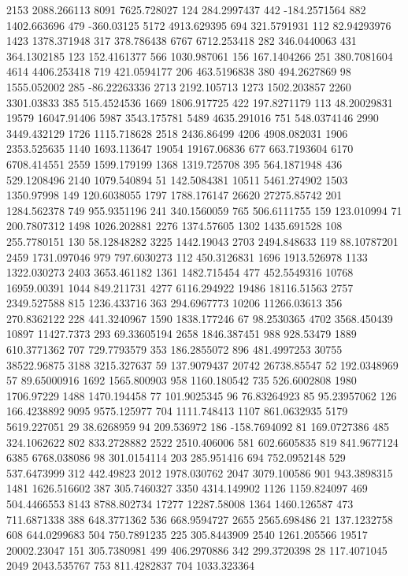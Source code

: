 2153	2088.266113
8091	7625.728027
124	284.2997437
442	-184.2571564
882	1402.663696
479	-360.03125
5172	4913.629395
694	321.5791931
112	82.94293976
1423	1378.371948
317	378.786438
6767	6712.253418
282	346.0440063
431	364.1302185
123	152.4161377
566	1030.987061
156	167.1404266
251	380.7081604
4614	4406.253418
719	421.0594177
206	463.5196838
380	494.2627869
98	1555.052002
285	-86.22263336
2713	2192.105713
1273	1502.203857
2260	3301.03833
385	515.4524536
1669	1806.917725
422	197.8271179
113	48.20029831
19579	16047.91406
5987	3543.175781
5489	4635.291016
751	548.0374146
2990	3449.432129
1726	1115.718628
2518	2436.86499
4206	4908.082031
1906	2353.525635
1140	1693.113647
19054	19167.06836
677	663.7193604
6170	6708.414551
2559	1599.179199
1368	1319.725708
395	564.1871948
436	529.1208496
2140	1079.540894
51	142.5084381
10511	5461.274902
1503	1350.97998
149	120.6038055
1797	1788.176147
26620	27275.85742
201	1284.562378
749	955.9351196
241	340.1560059
765	506.6111755
159	123.010994
71	200.7807312
1498	1026.202881
2276	1374.57605
1302	1435.691528
108	255.7780151
130	58.12848282
3225	1442.19043
2703	2494.848633
119	88.10787201
2459	1731.097046
979	797.6030273
112	450.3126831
1696	1913.526978
1133	1322.030273
2403	3653.461182
1361	1482.715454
477	452.5549316
10768	16959.00391
1044	849.211731
4277	6116.294922
19486	18116.51563
2757	2349.527588
815	1236.433716
363	294.6967773
10206	11266.03613
356	270.8362122
228	441.3240967
1590	1838.177246
67	98.2530365
4702	3568.450439
10897	11427.7373
293	69.33605194
2658	1846.387451
988	928.53479
1889	610.3771362
707	729.7793579
353	186.2855072
896	481.4997253
30755	38522.96875
3188	3215.327637
59	137.9079437
20742	26738.85547
52	192.0348969
57	89.65000916
1692	1565.800903
958	1160.180542
735	526.6002808
1980	1706.97229
1488	1470.194458
77	101.9025345
96	76.83264923
85	95.23957062
126	166.4238892
9095	9575.125977
704	1111.748413
1107	861.0632935
5179	5619.227051
29	38.6268959
94	209.536972
186	-158.7694092
81	169.0727386
485	324.1062622
802	833.2728882
2522	2510.406006
581	602.6605835
819	841.9677124
6385	6768.038086
98	301.0154114
203	285.951416
694	752.0952148
529	537.6473999
312	442.49823
2012	1978.030762
2047	3079.100586
901	943.3898315
1481	1626.516602
387	305.7460327
3350	4314.149902
1126	1159.824097
469	504.4466553
8143	8788.802734
17277	12287.58008
1364	1460.126587
473	711.6871338
388	648.3771362
536	668.9594727
2655	2565.698486
21	137.1232758
608	644.0299683
504	750.7891235
225	305.8443909
2540	1261.205566
19517	20002.23047
151	305.7380981
499	406.2970886
342	299.3720398
28	117.4071045
2049	2043.535767
753	811.4282837
704	1033.323364
